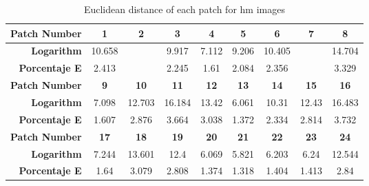 \begin{table}[H]
  \caption{Euclidean distance of each patch for hm images }
  \begin{center}
    \begin{tabularx}{\textwidth}{r c c c c c c c c}
    \toprule
        \textbf{Patch Number} & \textbf{1} & \textbf{2} & \textbf{3} & \textbf{4} & \textbf{5} & \textbf{6} & \textbf{7} & \textbf{8}\\ \midrule 
        \textbf{Logarithm} &10.658 &\cellcolor{colorgreen}{3.084} &9.917 &7.112 &9.206 &10.405 &\cellcolor{colorred}{18.933} &14.704\\ 
        \textbf{Porcentaje E} &2.413 &\cellcolor{colorgreen}{0.698} &2.245 &1.61 &2.084 &2.356 &\cellcolor{colorred}{4.287} &3.329\\ \midrule 
        \textbf{Patch Number} & \textbf{9} & \textbf{10} & \textbf{11} & \textbf{12} & \textbf{13} & \textbf{14} & \textbf{15} & \textbf{16}\\ \midrule 
        \textbf{Logarithm} &7.098 &12.703 &16.184 &13.42 &6.061 &10.31 &12.43 &16.483\\ 
        \textbf{Porcentaje E} &1.607 &2.876 &3.664 &3.038 &1.372 &2.334 &2.814 &3.732\\ \midrule 
        \textbf{Patch Number} & \textbf{17} & \textbf{18} & \textbf{19} & \textbf{20} & \textbf{21} & \textbf{22} & \textbf{23} & \textbf{24}\\ \midrule 
        \textbf{Logarithm} &7.244 &13.601 &12.4 &6.069 &5.821 &6.203 &6.24 &12.544\\ 
        \textbf{Porcentaje E} &1.64 &3.079 &2.808 &1.374 &1.318 &1.404 &1.413 &2.84\\ \midrule 
    \bottomrule
    \end{tabularx}
  \end{center}
\end{table}
